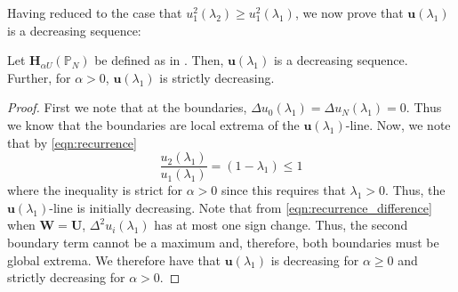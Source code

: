     Having reduced to the case that $u_1^2(\lambda_2) \geq u_1^2(\lambda_1)$, we now prove that $\mathbf{u}(\lambda_1)$ is a decreasing sequence:

    \begin{lem}\label{lem:decreasing}
    	Let $\mathbf{H}_{\alpha U}(\mathbb{P}_N)$ be defined as in . Then, $\mathbf{u}(\lambda_1)$ is a decreasing sequence. Further, for $\alpha > 0$, $\mathbf{u}(\lambda_1)$ is strictly decreasing.
    \end{lem}

    \begin{proof}
    First we note that at the boundaries, $\Delta u_0(\lambda_1) = \Delta u_N(\lambda_1) = 0$. Thus we know that the boundaries are local extrema of the $\mathbf{u}(\lambda_1)$-line. Now, we note that by \cref{eqn:recurrence}
    \begin{equation}
      \frac{u_2(\lambda_1)}{u_1(\lambda_1)} = (1 - \lambda_1) \leq 1
    \end{equation}
    where the inequality is strict for $\alpha > 0$ since this requires that $\lambda_1 > 0$. Thus, the $\mathbf{u}(\lambda_1)$-line is initially decreasing. Note that from \cref{eqn:recurrence_difference} when $\mathbf{W} = \mathbf{U}$, $\Delta^2 u_i(\lambda_1)$ has at most one sign change. Thus, the second boundary term cannot be a maximum and, therefore, both boundaries must be global extrema. We therefore have that $\mathbf{u}(\lambda_1)$ is decreasing for $\alpha \geq 0$ and strictly decreasing for $\alpha > 0$.
    \end{proof}

